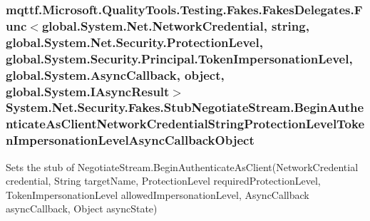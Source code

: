 \hypertarget{class_system_1_1_net_1_1_security_1_1_fakes_1_1_stub_negotiate_stream_aed68e55d3c09aaba9c24aa764355862b}{
\subsubsection[{Begin\-Authenticate\-As\-Client\-Network\-Credential\-String\-Protection\-Level\-Token\-Impersonation\-Level\-Async\-Callback\-Object}]{\setlength{\rightskip}{0pt plus 5cm}mqttf.\-Microsoft.\-Quality\-Tools.\-Testing.\-Fakes.\-Fakes\-Delegates.\-Func$<$global.\-System.\-Net.\-Network\-Credential, string, global.\-System.\-Net.\-Security.\-Protection\-Level, global.\-System.\-Security.\-Principal.\-Token\-Impersonation\-Level, global.\-System.\-Async\-Callback, object, global.\-System.\-I\-Async\-Result$>$ System.\-Net.\-Security.\-Fakes.\-Stub\-Negotiate\-Stream.\-Begin\-Authenticate\-As\-Client\-Network\-Credential\-String\-Protection\-Level\-Token\-Impersonation\-Level\-Async\-Callback\-Object}}\label{class_system_1_1_net_1_1_security_1_1_fakes_1_1_stub_negotiate_stream_aed68e55d3c09aaba9c24aa764355862b}


Sets the stub of Negotiate\-Stream.\-Begin\-Authenticate\-As\-Client(\-Network\-Credential credential, String target\-Name, Protection\-Level required\-Protection\-Level, Token\-Impersonation\-Level allowed\-Impersonation\-Level, Async\-Callback async\-Callback, Object async\-State)

